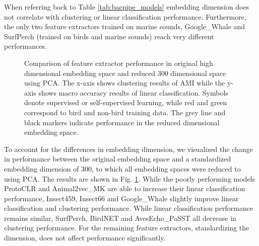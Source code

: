 When referring back to Table \ref{tab:bacpipe_models} embedding dimension does not correlate with clustering or linear classification performance.
Furthermore, the only two feature extractors trained on marine sounds, Google\_Whale and SurfPerch (trained on birds and marine sounds) reach very different performances.
    
\begin{figure}[ht]
    \centerline{}
    \caption{Comparison of feature extractor performance in original high dimensional embedding space and reduced 300 dimensional space using PCA. 
    The x-axis shows clustering results of AMI while the y-axis shows macro accuracy results of linear classification. 
    Symbols denote supervised or self-supervised learning, while red and green correspond to bird and non-bird training data. 
    The grey line and black markers indicate performance in the reduced dimensional embedding space.}
    \label{fig:orig_vs_ump}
\end{figure}

To account for the differences in embedding dimension, we visualized the change in performance between the original embedding space and a standardized embedding dimension of 300, to which all embedding spaces were reduced to using PCA.
The results are shown in Fig. \ref{fig:orig_vs_ump}.
While the poorly performing models ProtoCLR and Animal2vec\_MK are able to increase their linear classification performance, Insect459, Insect66 and Google\_Whale slightly improve linear classification and clustering performance.
While linear classification performance remains similar, SurfPerch, BirdNET and AvesEcho\_PaSST all decrease in clustering performance.
For the remaining feature extractors, standardizing the dimension, does not affect performance significantly.